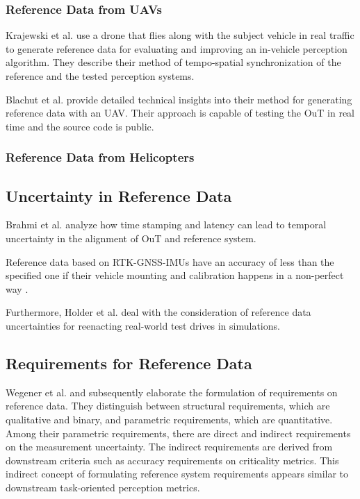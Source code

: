 \documentclass[conference]{IEEEtran}
\newcommand{\new}[1]{{\color{my-red}#1}}
\begin{document}
\subsubsection{Reference Data from UAVs}
\label{sec:ref_data_UAVs}

Krajewski et al. \cite{Krajewski2021drone} use a drone that flies along with the subject vehicle in real traffic to generate reference data for evaluating and improving an in-vehicle perception algorithm. 
They describe their method of tempo-spatial synchronization of the reference and the tested perception systems.


Blachut et al. \cite{Blachut2022} provide detailed technical insights into their method for generating reference data with an UAV. 
Their approach is capable of testing the OuT in real time and the source code is public. 

\subsubsection{Reference Data from Helicopters}
\label{sec:ref_data_helicopters}

\subsection{Uncertainty in Reference Data}
\label{sec:ref_data_uncertainty}

Brahmi et al. \cite{Brahmi2013timestamping} analyze how time stamping and latency can lead to temporal uncertainty in the alignment of OuT and reference system.

Reference data based on RTK-GNSS-IMUs have an accuracy of less than the specified one if their vehicle mounting and calibration happens in a non-perfect way \cite{Holder2022calibration, Brahmi2020diss}.

Furthermore, Holder et al. \cite{Holder2022calibration} deal with the consideration of reference data uncertainties for reenacting real-world test drives in simulations.

\subsection{\new{Requirements for Reference Data}}
\label{sec:ref_data_requirements}

Wegener et al. \cite{Wegener2012requirements} and subsequently \cite[Sec. 8]{Brahmi2020diss} elaborate the formulation of requirements on reference data. 
They distinguish between structural requirements, which are qualitative and binary, and parametric requirements, which are quantitative. 
Among their parametric requirements, there are direct and indirect requirements on the measurement uncertainty. 
The indirect requirements are derived from downstream criteria such as accuracy requirements on criticality metrics. 
This indirect concept of formulating reference system requirements appears similar to downstream task-oriented perception metrics. 
\end{document}
